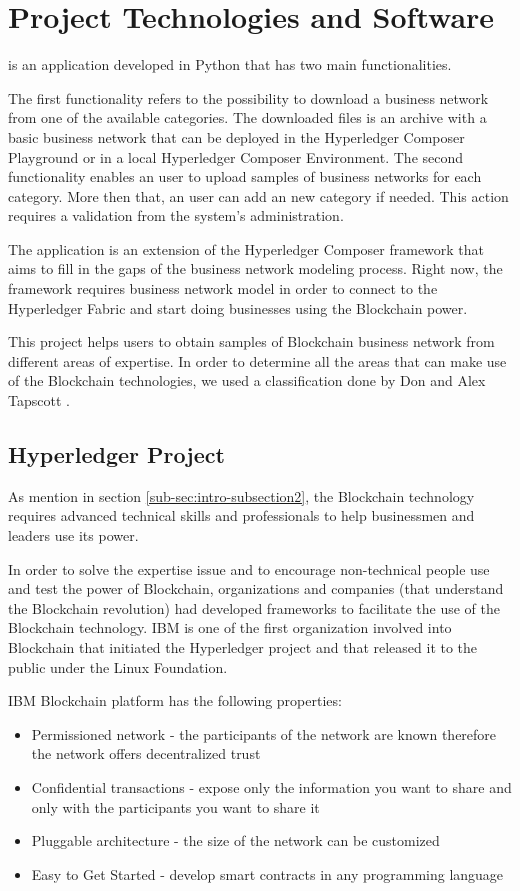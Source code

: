 \chapter{Project Technologies and Software}
\label{chapter:chapter2}

\textbf{\project} is an application developed in Python that has two main functionalities.

The first functionality refers to the possibility to download a business network from one of the available categories. The downloaded files is an archive with a basic business network that can be deployed in the Hyperledger Composer Playground or in a local Hyperledger Composer Environment.
The second functionality enables an user to upload samples of business networks for each category. More then that, an user can add an new category if needed. This action requires a validation from the system's administration.

The application is an extension of the Hyperledger Composer framework that aims to fill in the gaps of the business network modeling process. 
Right now, the framework requires business network model in order to connect to the Hyperledger Fabric and start doing businesses using the Blockchain power.

This project helps users to obtain samples of Blockchain business network from different areas of expertise.
In order to determine all the areas that can make use of the Blockchain technologies, we used a classification done by Don and Alex Tapscott \cite{tapscott}.

\section{Hyperledger Project}
\label{sub-sec:chapter1-section1}
As mention in section \ref{sub-sec:intro-subsection2}, the Blockchain technology requires advanced technical skills and professionals to help businessmen and leaders use its power.

In order to solve the expertise issue and to encourage non-technical people use and test the power of Blockchain, organizations and companies (that understand the Blockchain revolution) had developed frameworks to facilitate the use of the Blockchain technology. IBM is one of the first organization involved into Blockchain that initiated the Hyperledger project and that released it to the public under the Linux Foundation.

IBM Blockchain platform has the following properties:
\begin{itemize}
	\item Permissioned network - the participants of the network are known therefore the network offers decentralized trust
	\item Confidential transactions - expose only the information you want to share and only with the participants you want to share it
	\item Pluggable architecture - the size of the network can be customized
	\item Easy to Get Started - develop smart contracts in any programming language 
\end{itemize}

